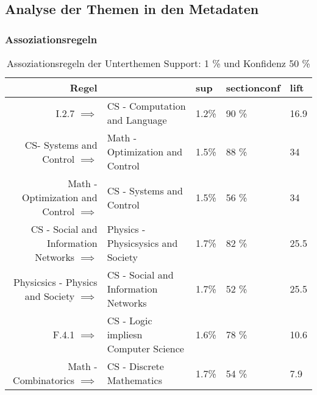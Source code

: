 \subsection{Analyse der Themen in den Metadaten}
\subsubsection{Assoziationsregeln}
\begin{table}[H]
\centering %
\begin{tabular}{|rl|l|l|l|}
	\hline
	\textbf{Regel}& &\textbf{sup} &section\textbf{conf} &\textbf{lift}\\
	\hline
	\small I.2.7 $\implies$ &\small CS - Computation and Language &1.2\% &90 \% &16.9 \\
	\small CS- Systems and Control $\implies$ &  \small Math - Optimization and Control &1.5\% &88 \% &34 \\
	\small Math - Optimization and Control $\implies$ & \small CS - Systems and Control  &1.5\% &56 \% &34 \\
	\small CS - Social and Information Networks $\implies$ & \small Physics - Physicsysics and Society &1.7\% &82 \% &25.5 \\
	\small Physicsics - Physics and Society $\implies$ & \small CS - Social and Information Networks &1.7\% &52 \% &25.5 \\
	\small F.4.1 $\implies$ & \small CS - Logic impliesn Computer Science &1.6\% &78 \% &10.6 \\
	\small Math - Combinatorics $\implies$ & \small CS - Discrete Mathematics  &1.7\% &54 \% &7.9 \\
	\hline
\end{tabular}
 \caption{Assoziationsregeln der Unterthemen Support: 1 \% und Konfidenz 50 \%}
\end{table}
